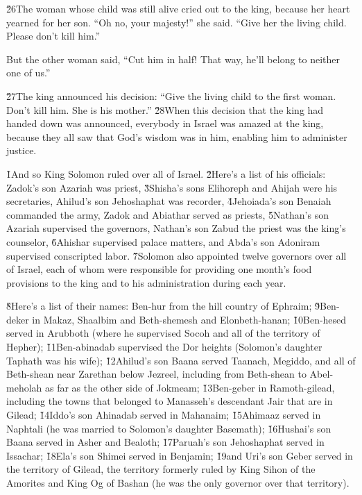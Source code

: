 \v{26}The woman whose child was still alive cried out to the king, because her heart yearned for her son. ``Oh no, your majesty!'' she said. ``Give her the living child. Please don't kill him.''

But the other woman said, ``Cut him in half! That way, he'll belong to neither one of us.''

\v{27}The king announced his decision: ``Give the living child to the first woman. Don't kill him. She is his mother.'' \v{28}When this decision that the king had handed down was announced, everybody in Israel was amazed at the king, because they all saw that God's wisdom was in him, enabling him to administer justice.

\v{1}And so King Solomon ruled over all of Israel. \v{2}Here's a list of his officials: Zadok's son Azariah was priest, \v{3}Shisha's sons Elihoreph and Ahijah were his secretaries, Ahilud's son Jehoshaphat was recorder, \v{4}Jehoiada's son Benaiah commanded the army, Zadok and Abiathar served as priests, \v{5}Nathan's son Azariah supervised the governors, Nathan's son Zabud the priest was the king's counselor, \v{6}Ahishar supervised palace matters, and Abda's son Adoniram supervised conscripted labor. \v{7}Solomon also appointed twelve governors over all of Israel, each of whom were responsible for providing one month's food provisions to the king and to his administration during each year.

\v{8}Here's a list of their names: Ben-hur from the hill country of Ephraim; \v{9}Ben-deker in Makaz, Shaalbim and Beth-shemesh and Elonbeth-hanan; \v{10}Ben-hesed served in Arubboth (where he supervised Socoh and all of the territory of Hepher); \v{11}Ben-abinadab supervised the Dor heights (Solomon's daughter Taphath was his wife); \v{12}Ahilud's son Baana served Taanach, Megiddo, and all of Beth-shean near Zarethan below Jezreel, including from Beth-shean to Abel-meholah as far as the other side of Jokmeam; \v{13}Ben-geber in Ramoth-gilead, including the towns that belonged to Manasseh's descendant Jair that are in Gilead; \v{14}Iddo's son Ahinadab served in Mahanaim; \v{15}Ahimaaz served in Naphtali (he was married to Solomon's daughter Basemath); \v{16}Hushai's son Baana served in Asher and Bealoth; \v{17}Paruah's son Jehoshaphat served in Issachar; \v{18}Ela's son Shimei served in Benjamin; \v{19}and Uri's son Geber served in the territory of Gilead, the territory formerly ruled by King Sihon of the Amorites and King Og of Bashan (he was the only governor over that territory).

